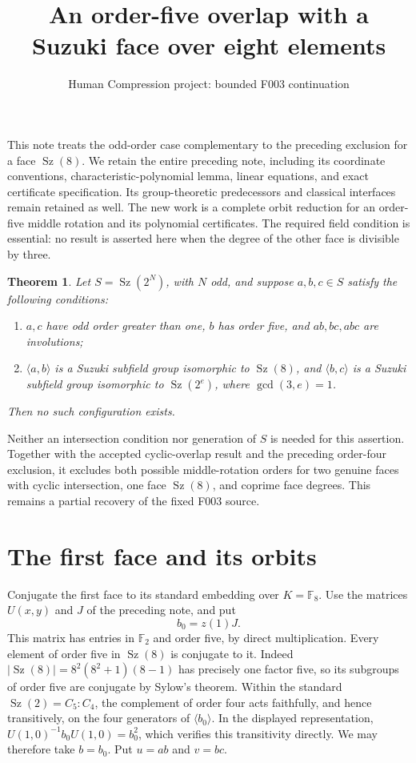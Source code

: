 \documentclass[11pt,a4paper]{article}
\title{An order-five overlap with a Suzuki face over eight elements}
\author{Human Compression project: bounded F003 continuation}
\date{}
\newtheorem{theorem}{Theorem}
\newcommand{\Sz}{\operatorname{Sz}}
\newcommand{\F}{\mathbb F}
\begin{document}
\maketitle

This note treats the odd-order case complementary to the preceding
exclusion for a face $\Sz(8)$. We retain the entire preceding note,
including its coordinate conventions, characteristic-polynomial lemma,
linear equations, and exact certificate specification. Its group-theoretic
predecessors and classical interfaces remain retained as well.
The new work is a complete orbit reduction for an order-five middle
rotation and its polynomial certificates. The required field condition
is essential: no result is asserted here when the degree of the other
face is divisible by three.

\begin{theorem}\label{main}
Let $S=\Sz(2^N)$, with $N$ odd, and suppose
$a,b,c\in S$ satisfy the following conditions:
\begin{enumerate}
\item $a,c$ have odd order greater than one, $b$ has order five,
and $ab,bc,abc$ are involutions;
\item $\langle a,b\rangle$ is a Suzuki subfield group isomorphic
to $\Sz(8)$, and $\langle b,c\rangle$ is a Suzuki subfield group
isomorphic to $\Sz(2^e)$, where $\gcd(3,e)=1$.
\end{enumerate}
Then no such configuration exists.
\end{theorem}

Neither an intersection condition nor generation of $S$ is needed
for this assertion. Together with the accepted cyclic-overlap result
and the preceding order-four exclusion, it excludes both possible
middle-rotation orders for two genuine faces with cyclic intersection,
one face $\Sz(8)$, and coprime face degrees. This remains a partial
recovery of the fixed F003 source.

\section*{The first face and its orbits}

Conjugate the first face to its standard embedding over $K=\F_8$.
Use the matrices $U(x,y)$ and $J$ of the preceding note, and put
\[
                         b_0=z(1)J.
\]
This matrix has entries in $\F_2$ and order five, by direct
multiplication. Every element of order five in $\Sz(8)$ is conjugate
to it. Indeed $|\Sz(8)|=8^2(8^2+1)(8-1)$ has precisely one factor
five, so its subgroups of order five are conjugate by Sylow's theorem.
Within the standard $\Sz(2)=C_5:C_4$, the complement of order four
acts faithfully, and hence transitively, on the four generators of
$\langle b_0\rangle$. In the displayed representation,
$U(1,0)^{-1}b_0U(1,0)=b_0^2$, which verifies this transitivity
directly. We may therefore take
$b=b_0$. Put $u=ab$ and $v=bc$.
\end{document}
